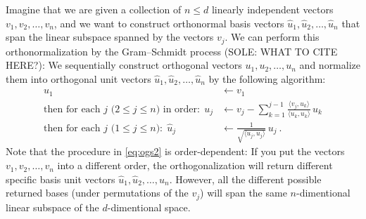 \documentclass{article}
\newcommand{\inner}[2]{\langle{#1},{#2}\rangle}
\begin{document}
Imagine that we are given a collection of $n\leq d$ linearly independent vectors $v_1,v_2,\ldots,v_n$,
and we want to construct orthonormal basis vectors $\hat{u}_1,\hat{u}_2,\ldots,\hat{u}_n$ that span the linear subspace spanned by the vectors $v_j$.
We can perform this orthonormalization by the Gram--Schmidt process (SOLE: WHAT TO CITE HERE?):
We sequentially construct orthogonal vectors $u_1,u_2,\ldots,u_n$ and normalize them into orthogonal unit vectors $\hat{u}_1,\hat{u}_2,\ldots,\hat{u}_n$ by the following algorithm:
\begin{align}
    u_1 &\leftarrow v_1 \label{eq:ogs1}
    \\
    \mbox{then for each $j$ ($2\leq j\leq n$) in order:} ~~ u_j &\leftarrow v_j - \sum_{k=1}^{j-1} \frac{\inner{v_j}{u_k}}{\inner{u_k}{u_k}}\,u_k \label{eq:ogs2}
    \\
    \mbox{then for each $j$ ($1\leq j\leq n$):} ~~ \hat{u}_j &\leftarrow \frac{1}{\sqrt{\inner{u_j}{u_j}}}\,u_j ~. \label{eq:ogs3}
\end{align}
Note that the procedure in \eqref{eq:ogs2} is order-dependent: If you put the vectors $v_1,v_2,\ldots,v_n$ into a different order, the orthogonalization will return different specific basis unit vectors $\hat{u}_1,\hat{u}_2,\ldots,\hat{u}_n$.
However, all the different possible returned bases (under permutations of the $v_j$) will span the same $n$-dimentional linear subspace of the $d$-dimentional space.
\end{document}
